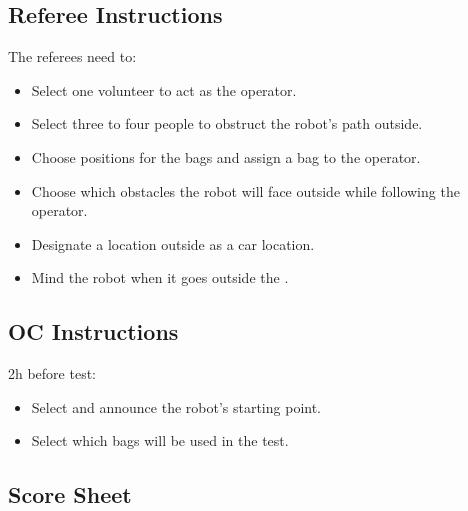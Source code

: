 \subsection*{Referee Instructions}

The referees need to:
\begin{itemize}[nosep]
	\item Select one volunteer to act as the operator.
	\item Select three to four people to obstruct the robot's path outside.
	\item Choose positions for the bags and assign a bag to the operator.
	\item Choose which obstacles the robot will face outside while following the operator.
	\item Designate a location outside as a car location.
	\item Mind the robot when it goes outside the \Arena{}.
\end{itemize}

\subsection*{OC Instructions}

2h before test:
\begin{itemize}[nosep]
	\item Select and announce the robot's starting point.
	\item Select which bags will be used in the test.
\end{itemize}

\subsection*{Score Sheet}

